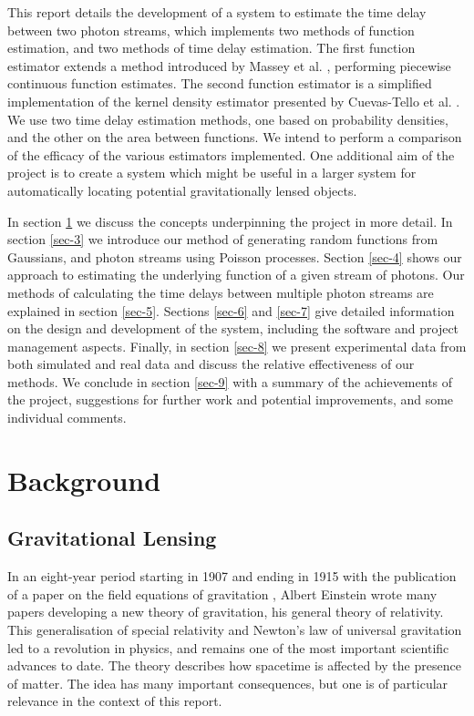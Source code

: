 \documentclass[a4paper,11pt]{article}
\begin{document}
  This report details the development of a system to estimate the time delay
  between two photon streams, which implements two methods of function
  estimation, and two methods of time delay estimation. The first function
  estimator extends a method introduced by Massey et
  al. \cite{massey1996estimating}, performing piecewise continuous function
  estimates. The second function estimator is a simplified implementation of the
  kernel density estimator presented by Cuevas-Tello et
  al. \cite{cuevas2006accurate}. We use two time delay estimation methods, one
  based on probability densities, and the other on the area between
  functions. We intend to perform a comparison of the efficacy of the various
  estimators implemented. One additional aim of the project is to create a
  system which might be useful in a larger system for automatically locating
  potential gravitationally lensed objects.

  In section \ref{sec-2} we discuss the concepts underpinning the project in more
  detail. In section \ref{sec-3} we introduce our method of
  generating random functions from Gaussians, and photon streams using Poisson
  processes. Section \ref{sec-4} shows our approach to estimating the
  underlying function of a given stream of photons. Our methods of calculating
  the time delays between multiple photon streams are explained in section
  \ref{sec-5}. Sections \ref{sec-6} and \ref{sec-7} give detailed
  information on the design and development of the system, including the
  software and project management aspects. Finally, in section \ref{sec-8}
  we present experimental data from both simulated and real data and discuss the
  relative effectiveness of our methods. We conclude in section \ref{sec-9} with
  a summary of the achievements of the project, suggestions for further work and
  potential improvements, and some individual comments.
\section{Background}
\label{sec-2}
\subsection{Gravitational Lensing}
\label{sec-2-1}

   In an eight-year period starting in 1907 and ending in 1915 with the
   publication of a paper on the field equations of gravitation
   \cite{einstein1915general}, Albert Einstein wrote many papers developing a
   new theory of gravitation, his general theory of relativity. This
   generalisation of special relativity and Newton's law of universal
   gravitation led to a revolution in physics, and remains one of the most
   important scientific advances to date. The theory describes how spacetime is
   affected by the presence of matter. The idea has many important consequences,
   but one is of particular relevance in the context of this report.
\end{document}

